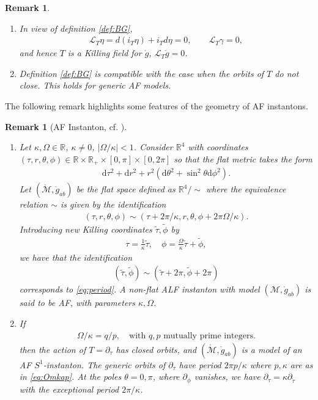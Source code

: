 \documentclass[a4paper,10pt,reqno]{amsart}
\newcommand{\Reals}{\mathbb{R}}
\newcommand{\cM}{\mathcal{M}}
\theoremstyle{plain}
\newtheorem{remark}[thm]{Remark}
\renewcommand{\d}{\mathrm{d}}
\newcommand{\Lie}{\mathcal{L}}
\newcommand{\gring}{\mathring{g}}
\numberwithin{equation}{section}
\begin{document}
\begin{remark} \label{rem:T}
\begin{enumerate} 
\item In view of definition \ref{def:BG},
\begin{align} 
\Lie_T \eta = d(i_T \eta) + i_T d\eta = 0,
\qquad
\Lie_T \gamma = 0,
\end{align} 
and hence $T$ is a Killing field for $\gring$,
$\Lie_T \gring = 0$.
\item 
Definition \ref{def:BG} is compatible with the case when the   orbits of $T$ do not close. This holds for generic AF models. 
\end{enumerate} 
\end{remark} 

The following remark highlights some features of the geometry of AF instantons. 
\begin{remark}[AF Instanton, cf. ] \label{def:AF} 
\begin{enumerate} 
\item 
Let $\kappa, \Omega \in \Reals$, $\kappa \ne 0$, $|\Omega/\kappa| < 1$. Consider $\Reals^4$ with coordinates $(\tau, r, \theta, \phi) \in \Reals \times \Reals_+ \times [0,\pi] \times [0,2\pi]$ so that the flat metric takes the form 
\begin{align} 
\d\tau^2 + \d r^2 + r^2(\d\theta^2 + \sin^2\theta \d\phi^2) .
\end{align} 
Let $(\mathring{\cM}, \mathring{g}_{ab})$ be the flat space defined as $\Reals^4/\sim$ where the equivalence relation $\sim$ is given by the identification 
\begin{align}\label{eq:period} 
(\tau, r,\theta,\phi) \sim (\tau+2\pi/\kappa,r,\theta,\phi + 2\pi\Omega/\kappa) .
\end{align}
Introducing new Killing coordinates $\tilde\tau, \tilde\phi$ by 
\begin{align} 
\tau = \frac{1}{\kappa} \tilde \tau, \quad \phi = \frac{\Omega}{\kappa} \tilde \tau + \tilde \phi , 
\end{align} 
we have that the identification 
\begin{align} \label{eq:tperiod}
(\tilde\tau, \tilde\phi)\sim (\tilde \tau + 2\pi, \tilde \phi + 2\pi) 
\end{align} 
corresponds to \eqref{eq:period}. 
A non-flat ALF instanton with model $(\cM, \mathring{g}_{ab})$ is said to be AF, with parameters $\kappa, \Omega$.
\item If  
\begin{align} \label{eq:Omkap} 
\Omega/\kappa = q/p, \quad \text{with $q,p$ mutually prime integers.}
\end{align} 
then the action of $T = \partial_\tau$ has closed orbits, and $(\mathring{\cM}, \mathring{g}_{ab})$ is a model of an AF $S^1$-instanton. The generic orbits of $\partial_\tau$ have period $2\pi p/\kappa$ where $p,\kappa$ are as in \eqref{eq:Omkap}. At the poles $\theta = 0,\pi$, where $\partial_\phi$ vanishes, we have $\partial_\tau = \kappa \partial_{\tilde \tau}$ with the exceptional period $2\pi/\kappa$. 
\end{enumerate}
\end{remark} 
\end{document}
